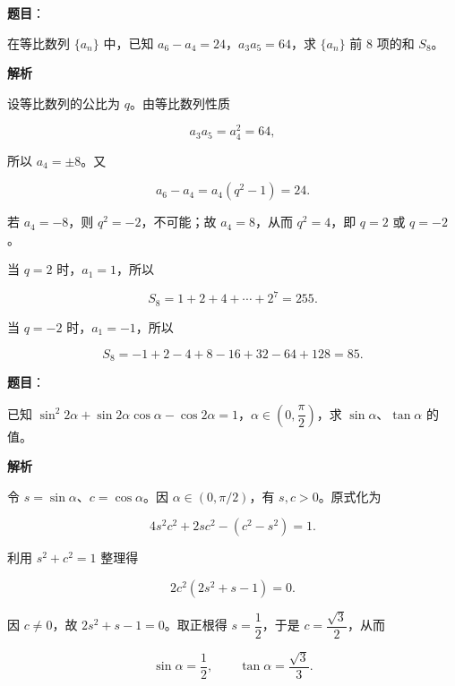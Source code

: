 \begin{answer}

\textbf{题目}：

在等比数列 $\{a_n\}$ 中，已知 $a_6-a_4=24$，$a_3a_5=64$，求 $\{a_n\}$ 前 8 项的和 $S_8$。

\textbf{解析}

设等比数列的公比为 $q$。由等比数列性质

\nopagebreak[4]
\[
a_3a_5=a_4^2=64,
\]

所以 $a_4=\pm8$。又

\nopagebreak[4]
\[
a_6-a_4=a_4(q^2-1)=24.
\]

若 $a_4=-8$，则 $q^2=-2$，不可能；故 $a_4=8$，从而 $q^2=4$，即 $q=2$ 或 $q=-2$。

当 $q=2$ 时，$a_1=1$，所以

\nopagebreak[4]
\[
S_8=1+2+4+\cdots+2^7=255.
\]

当 $q=-2$ 时，$a_1=-1$，所以

\nopagebreak[4]
\[
S_8=-1+2-4+8-16+32-64+128=85.
\]


\end{answer}
\begin{answer}

\textbf{题目}：

已知 $\sin^2 2\alpha+\sin2\alpha\cos\alpha-\cos2\alpha=1$，$\alpha\in\left(0,\dfrac\pi2\right)$，求 $\sin\alpha\text{、}\tan\alpha$ 的值。

\textbf{解析}

令 $s=\sin\alpha$、$c=\cos\alpha$。因 $\alpha\in(0,\pi/2)$，有 $s,c>0$。原式化为

\nopagebreak[4]
\[
4s^2c^2+2sc^2-(c^2-s^2)=1.
\]

利用 $s^2+c^2=1$ 整理得

\nopagebreak[4]
\[
2c^2(2s^2+s-1)=0.
\]

因 $c\neq0$，故 $2s^2+s-1=0$。取正根得 $s=\dfrac12$，于是 $c=\dfrac{\sqrt3}{2}$，从而

\nopagebreak[4]
\[
\sin\alpha=\frac12,\qquad \tan\alpha=\frac{\sqrt3}{3}.
\]


\end{answer}
